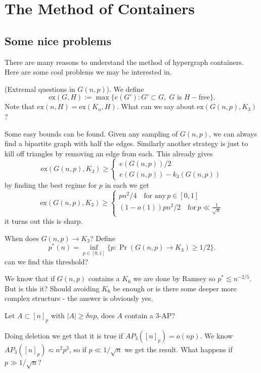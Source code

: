 \section{The Method of Containers}

\subsection{Some nice problems}
There are many reasons to understand the method of hypergraph
containers. Here are some cool problems we may be interested
in.
\begin{problem}
	\label{containers:prob:extremalK3}
	(Extremal questions in $G(n,p)$). We define
	\[
		\text{ex}(G,H) := \max \{ e(G'): G' \subset G,\; G \text{ is }
		H-\text{free}\}.
	\]
	Note that $\text{ex}(n,H) = \text{ex}(K_n,H)$. What can we say about
	$\text{ex}(G(n,p),K_3)$?
\end{problem}

Some easy bounds can be found. Given any sampling of $G(n,p)$, we can
always find a bipartite graph with half the edges. Similarly
another strategy is just to kill off triangles by removing an edge
from each. This already gives
\[
	\text{ex}(G(n,p), K_3) \geq
	\begin{cases}
		e(G(n,p))/2\\
		e(G(n,p)) - k_3(G(n,p))
	\end{cases}
\]
by finding the best regime for $p$ in each we get
\[
	\text{ex}(G(n,p), K_3) \geq
	\begin{cases}
		pn^2/4 \quad \text{for any}\,p \in [0,1]\\
		(1 - o(1))pn^2/2 \quad \text{for}\, p \ll \frac{1}{\sqrt{n}}
	\end{cases}
\]
it turns out this is sharp.

\begin{problem}
	When does $G(n,p) \to K_3$? Define
	\[
		p^*(n) = \inf_{p \in [0,1]} \{p : \Pr(G(n,p) \to K_3) \geq 1/2\}.
	\]
	can we find this threshold?
\end{problem}
We know that if $G(n,p)$ contains a $K_6$ we are done by Ramsey so
$p^* \lesssim n^{-2/5}$. But is this it?
Should avoiding $K_6$ be enough or is there some deeper more complex
structure - the answer is obviously yes.

\begin{problem}
	Let $A \subset [n]_p$ with $|A| \geq \delta np$, does $A$ contain a $3$-AP?
\end{problem}
Doing deletion we get that it is true if  $AP_3([n]_p) = o(np)$. We
know $AP_3([n]_p) \eqsim n^2p^3$, so if $p \ll 1/\sqrt{n}$
we get the result. What happens if $p \gg 1/\sqrt{n}$?

